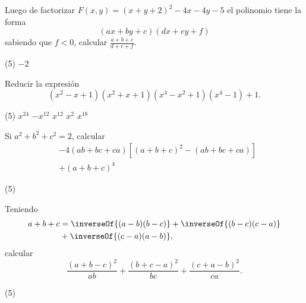 \begin{multicols}{2}
    \begin{exercise}
        Luego de factorizar $F(x,y) = (x + y + 2)^2 - 4x - 4y - 5$ el polinomio tiene la forma
        \[
            (ax + by + c)(dx + ey + f)
        \]
        sabiendo que $f < 0$, calcular $\frac{a + b + c}{d + e + f}$.
        \begin{tasks}(5)
            \task $-2$
        \end{tasks}
    \end{exercise}

    \begin{exercise}
        Reducir la expresión
        \[
            (x^2 - x + 1)(x^2 + x + 1)(x^4 - x^2 + 1)(x^4 - 1) + 1.
        \]
        \begin{tasks}(5)
            \task $x^{24}$
            \task $-x^{12}$
            \task $x^{12}$
            \task $x^2$
            \task $x^{18}$
        \end{tasks}
    \end{exercise}

    \begin{exercise}
        Si $a^2 + b^2 + c^2 = 2$, calcular
        \begin{align*}
            &- 4(ab + bc + ca)[(a + b + c)^2 - (ab + bc + ca)]\\
            &+ (a + b + c)^4
        \end{align*}
        \begin{tasks}(5)
        \end{tasks}
    \end{exercise}

    \begin{exercise}
        Teniendo
        \begin{align*}
            a + b + c &= \inverseOf{(a - b)(b - c)} +\inverseOf{(b - c)(c - a)} \\& +\inverseOf{(c - a)(a - b)},
        \end{align*}
        calcular
        \[
            \frac{(a + b - c)^2}{ab} + \frac{(b + c - a)^2}{bc} + \frac{(c + a - b)^2}{ca}.
        \]
        \begin{tasks}(5)
        \end{tasks}
    \end{exercise}


\end{multicols}
